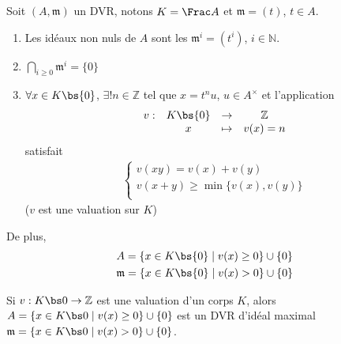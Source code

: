         \begin{prop}
            Soit $(A, \mathfrak{m})$ un DVR, notons $K = \Frac A$ et $\mathfrak{m} = (t)$, $t \in A$.
            \begin{enumerate}
                \item Les idéaux non nuls de $A$ sont les $\mathfrak{m}^i = (t^i)$, $i \in \mathbb{N}$.
                \item $\bigcap_{i \geq 0} \mathfrak{m}^i = \{0\}$
                \item $\forall x \in K \bs \{0\}$, $\exists ! n \in \mathbb{Z}$ tel que $x = t^nu$, $u \in A^\times$ et l'application
                \begin{align*}
                    \begin{array}{cccc}
                        v : & K \bs \{0\} & \to & \mathbb{Z} \\
                        & x & \mapsto & v(x) = n \\
                    \end{array}
                \end{align*}
                satisfait 
                \begin{align*}
                    \begin{cases}
                        v(xy) = v(x) + v(y) \\
                        v(x + y) \geq \min \{v(x), v(y)\} \\
                    \end{cases}
                \end{align*}
                ($v$ est une valuation sur $K$)
            \end{enumerate}
            De plus,
            \begin{align*}
                &A = \{x \in K \bs \{0\} \mid v(x) \geq 0\} \cup \{0\} \\
                &\mathfrak{m} = \{x \in K \bs \{0\} \mid v(x) > 0\} \cup \{0\} \\
            \end{align*}
        \end{prop}
        \begin{exo}
            Si $v : K \bs 0 \to \mathbb{Z}$ est une valuation d'un corps $K$, alors $A = \{x \in K \bs 0 \mid v(x) \geq 0\} \cup \{0\}$ est un DVR d'idéal maximal $\mathfrak{m} = \{x \in K \bs 0 \mid v(x) > 0\} \cup \{0\}$.  
        \end{exo}
